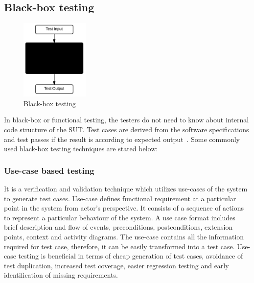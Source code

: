 \subsection{Black-box testing}
\begin{figure}
  \vspace{-35pt}
  \begin{center}
    \includegraphics[width=0.30\textwidth]{chapter2/blackBox.png}
  \end{center}
  \vspace{-20pt}
  \bigskip
  \caption{Black-box testing}
  \label{fig:blackBox}
  \vspace{-18pt}
\end{figure}
In black-box or functional testing, the testers do not need to know about internal code structure of the SUT. Test cases are derived from the software specifications and test passes if the result is according to expected output~\cite{beizer1995black}. Some commonly used black-box testing techniques are stated below:

\subsubsection{Use-case based testing}
It is a verification and validation technique which utilizes use-cases of the system to generate test cases. Use-case defines functional requirement at a particular point in the system from actor's perspective. It consists of a sequence of actions to represent a particular behaviour of the system. A use case format includes brief description and flow of events, preconditions, postconditions, extension points, context and activity diagrams. The use-case contains all the information required for test case, therefore, it can be easily transformed into a test case. Use-case testing is beneficial in terms of cheap generation of test cases, avoidance of test duplication, increased test coverage, easier regression testing and early identification of missing requirements.  

